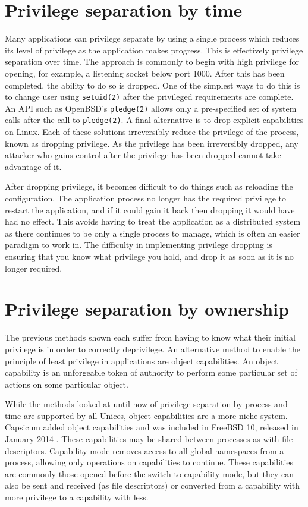 \documentclass[12pt,a4paper,twoside]{report}
\begin{document}
\section{Privilege separation by time}
\label{sec:priv-sep-time}

Many applications can privilege separate by using a single process which reduces its level of privilege as the application makes progress. This is effectively privilege separation over time. The approach is commonly to begin with high privilege for opening, for example, a listening socket below port 1000. After this has been completed, the ability to do so is dropped. One of the simplest ways to do this is to change user using \texttt{setuid(2)} after the privileged requirements are complete. An API such as OpenBSD's \texttt{pledge(2)} allows only a pre-specified set of system calls after the call to \texttt{pledge(2)}. A final alternative is to drop explicit capabilities on Linux. Each of these solutions irreversibly reduce the privilege of the process, known as dropping privilege. As the privilege has been irreversibly dropped, any attacker who gains control after the privilege has been dropped cannot take advantage of it.

After dropping privilege, it becomes difficult to do things such as reloading the configuration. The application process no longer has the required privilege to restart the application, and if it could gain it back then dropping it would have had no effect. This avoids having to treat the application as a distributed system as there continues to be only a single process to manage, which is often an easier paradigm to work in. The difficulty in implementing privilege dropping is ensuring that you know what privilege you hold, and drop it as soon as it is no longer required.

\section{Privilege separation by ownership}
\label{sec:priv-sep-ownership}

The previous methods shown each suffer from having to know what their initial privilege is in order to correctly deprivilege. An alternative method to enable the principle of least privilege in applications are object capabilities. An object capability is an unforgeable token of authority to perform some particular set of actions on some particular object.

While the methods looked at until now of privilege separation by process and time are supported by all Unices, object capabilities are a more niche system. Capsicum added object capabilities and was included in FreeBSD 10, released in January 2014 \citep{watson_capsicum_2010}. These capabilities may be shared between processes as with file descriptors. Capability mode removes access to all global namespaces from a process, allowing only operations on capabilities to continue. These capabilities are commonly those opened before the switch to capability mode, but they can also be sent and received (as file descriptors) or converted from a capability with more privilege to a capability with less.
\end{document}
